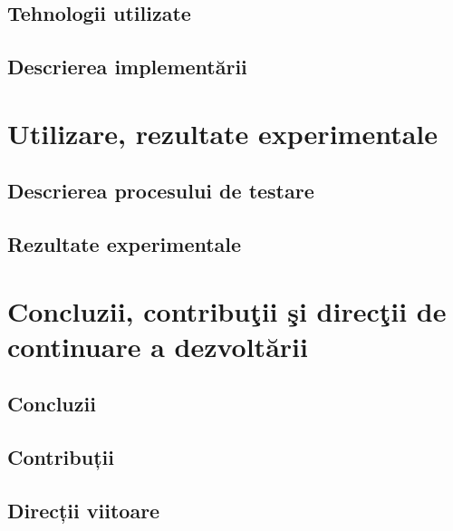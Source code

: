 \documentclass[12pt,a4paper]{report}
\begin{document}
\section{Tehnologii utilizate}
\section{Descrierea implementării}

\chapter{Utilizare, rezultate experimentale}
\section{Descrierea procesului de testare}
\section{Rezultate experimentale}

\chapter{Concluzii, contribuţii şi direcţii de continuare a dezvoltării}
\section{Concluzii}
\section{Contribuții}
\section{Direcții viitoare}




% 
\end{document}
